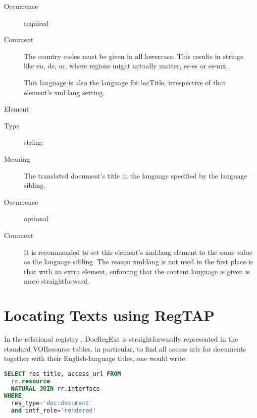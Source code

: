 \documentclass{ivoa}
\begin{document}
\begin{generated}
\begin{bigdescription}
\begin{description}
\item[Occurrence] required
\item[Comment] 
                The country codes must be given in all lowercase.  This
                results in strings like en, de, or, where regions
                might actually matter, es-es or es-mx.

                This language is also the language for locTitle,
                irrespective of that element's xml:lang setting.
              

\end{description}
\item[Element \xmlel{locTitle}]
\begin{description}
\item[Type] string: 
\item[Meaning] 
              	The translated document's title in the language specified
              	by the language sibling.
            	
\item[Occurrence] optional
\item[Comment] 
              	It is recommended to set this element's xml:lang element
              	to the same value as the language sibling.  The reason
              	xml:lang is not used in the first place is that with an
              	extra element, enforcing that the content language is
              	given is more straightforward.
              

\end{description}


\end{bigdescription}\endgroup

\endgroup
\end{generated}


\section{Locating Texts using RegTAP}
\label{sect:docregext-regtap}

In the relational registry \citep{2014ivoa.spec.1208D}, DocRegExt is
straightforwardly represented in the standard VOResource tables.  in
particular, to find all access urls for documents together with their
English-language titles, one would write:

\begin{lstlisting}[language=SQL]
SELECT res_title, access_url FROM
  rr.resource
  NATURAL JOIN rr.interface
WHERE
  res_type='doc:document'
  and intf_role='rendered'
\end{lstlisting}
\end{document}
